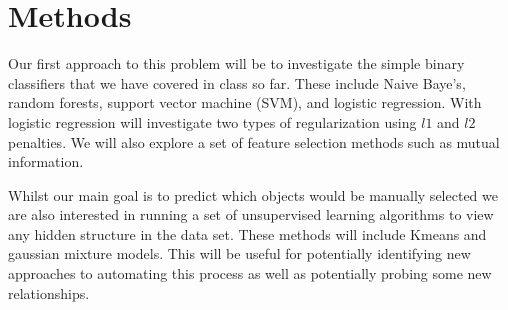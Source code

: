 \section{Methods}

Our first approach to this problem will be to investigate the simple binary classifiers that we have covered in class so far. These include Naive Baye's, random forests, support vector machine (SVM), and logistic regression. With logistic regression will investigate two types of regularization using $l1$ and $l2$ penalties. We will also explore a set of feature selection methods such as mutual information.

Whilst our main goal is to predict which objects would be manually selected we are also interested in running a set of unsupervised learning algorithms to view any hidden structure in the data set. These methods will include Kmeans and gaussian mixture models. This will be useful for potentially identifying new approaches to automating this process as well as potentially probing some new relationships.
